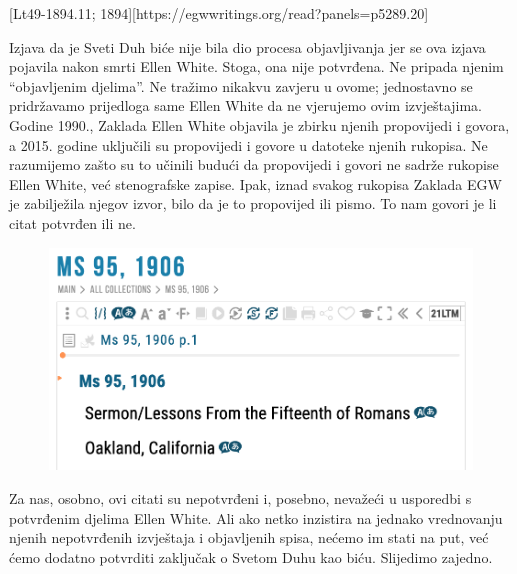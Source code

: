 [Lt49-1894.11; 1894][https://egwwritings.org/read?panels=p5289.20]

Izjava da je Sveti Duh biće nije bila dio procesa objavljivanja jer se ova izjava pojavila nakon smrti Ellen White. Stoga, ona nije potvrđena. Ne pripada njenim “objavljenim djelima”. Ne tražimo nikakvu zavjeru u ovome; jednostavno se pridržavamo prijedloga same Ellen White da ne vjerujemo ovim izvještajima. Godine 1990., Zaklada Ellen White objavila je zbirku njenih propovijedi i govora, a 2015. godine uključili su propovijedi i govore u datoteke njenih rukopisa. Ne razumijemo zašto su to učinili budući da propovijedi i govori ne sadrže rukopise Ellen White, već stenografske zapise. Ipak, iznad svakog rukopisa Zaklada EGW je zabilježila njegov izvor, bilo da je to propovijed ili pismo. To nam govori je li citat potvrđen ili ne.

\begin{figure}
    \centering
    \includegraphics[width=1\linewidth]{images/sermons-and-talks.png}
    \label{fig:enter-label}
\end{figure}

Za nas, osobno, ovi citati su nepotvrđeni i, posebno, nevažeći u usporedbi s potvrđenim djelima Ellen White. Ali ako netko inzistira na jednako vrednovanju njenih nepotvrđenih izvještaja i objavljenih spisa, nećemo im stati na put, već ćemo dodatno potvrditi zaključak o Svetom Duhu kao biću. Slijedimo zajedno.

